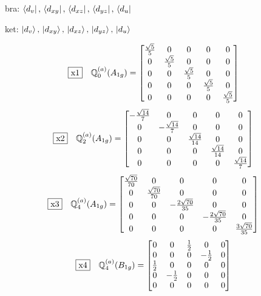 \documentclass[fleqn,10pt,landscape]{jsarticle}
\begin{document}
\vspace{5mm}

\noindent\textbullet\, bra: $\bra{d_{v}},\, \bra{d_{xy}},\, \bra{d_{xz}},\, \bra{d_{yz}},\, \bra{d_{u}}$

\noindent\textbullet\, ket: $\ket{d_{v}},\, \ket{d_{xy}},\, \ket{d_{xz}},\, \ket{d_{yz}},\, \ket{d_{u}}$

\begin{dmath*}
\fbox{x1}\quad \mathbb{Q}_{0}^{(a)}(A_{1g})=\begin{bmatrix} \frac{\sqrt{5}}{5} & 0 & 0 & 0 & 0 \\ 0 & \frac{\sqrt{5}}{5} & 0 & 0 & 0 \\ 0 & 0 & \frac{\sqrt{5}}{5} & 0 & 0 \\ 0 & 0 & 0 & \frac{\sqrt{5}}{5} & 0 \\ 0 & 0 & 0 & 0 & \frac{\sqrt{5}}{5} \end{bmatrix}
\end{dmath*}
\begin{dmath*}
\fbox{x2}\quad \mathbb{Q}_{2}^{(a)}(A_{1g})=\begin{bmatrix} - \frac{\sqrt{14}}{7} & 0 & 0 & 0 & 0 \\ 0 & - \frac{\sqrt{14}}{7} & 0 & 0 & 0 \\ 0 & 0 & \frac{\sqrt{14}}{14} & 0 & 0 \\ 0 & 0 & 0 & \frac{\sqrt{14}}{14} & 0 \\ 0 & 0 & 0 & 0 & \frac{\sqrt{14}}{7} \end{bmatrix}
\end{dmath*}
\begin{dmath*}
\fbox{x3}\quad \mathbb{Q}_{4}^{(a)}(A_{1g})=\begin{bmatrix} \frac{\sqrt{70}}{70} & 0 & 0 & 0 & 0 \\ 0 & \frac{\sqrt{70}}{70} & 0 & 0 & 0 \\ 0 & 0 & - \frac{2 \sqrt{70}}{35} & 0 & 0 \\ 0 & 0 & 0 & - \frac{2 \sqrt{70}}{35} & 0 \\ 0 & 0 & 0 & 0 & \frac{3 \sqrt{70}}{35} \end{bmatrix}
\end{dmath*}
\begin{dmath*}
\fbox{x4}\quad \mathbb{Q}_{4}^{(a)}(B_{1g})=\begin{bmatrix} 0 & 0 & \frac{1}{2} & 0 & 0 \\ 0 & 0 & 0 & - \frac{1}{2} & 0 \\ \frac{1}{2} & 0 & 0 & 0 & 0 \\ 0 & - \frac{1}{2} & 0 & 0 & 0 \\ 0 & 0 & 0 & 0 & 0 \end{bmatrix}
\end{dmath*}
\end{document}
